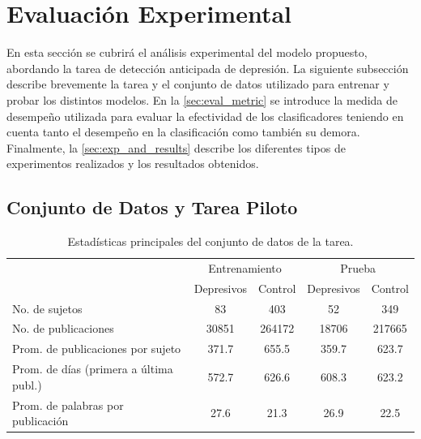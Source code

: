 \section{Evaluación Experimental}
\label{sec:exp}

En esta sección se cubrirá el análisis experimental del modelo propuesto, abordando la tarea de detección anticipada de depresión.
La siguiente subsección describe brevemente la tarea y el conjunto de datos utilizado para entrenar y probar los distintos modelos.
En la \autoref{sec:eval_metric} se introduce la medida de desempeño utilizada para evaluar la efectividad de los clasificadores teniendo en cuenta tanto el desempeño en la clasificación como también su demora.
Finalmente, la \autoref{sec:exp_and_results} describe los diferentes tipos de experimentos realizados y los resultados obtenidos.


\subsection{Conjunto de Datos y Tarea Piloto}
\label{sec:data_sets}

\begin{table}[t]
\centering
\caption{Estadísticas principales del conjunto de datos de la tarea.}
\label{tab:dataset}
\begin{tabular}{l c c|c c}
\hline
& \multicolumn{2}{c}{Entrenamiento} & \multicolumn{2}{c}{Prueba}\\
& Depresivos & Control & Depresivos & Control \\ \hline
No. de sujetos & 83 & 403 & 52 & 349 \\
No. de publicaciones & 30851 & 264172 & 18706 & 217665 \\
Prom. de publicaciones por sujeto & 371.7 & 655.5 & 359.7 & 623.7 \\
Prom. de días (primera a última publ.) & 572.7 & 626.6 & 608.3 & 623.2 \\
Prom. de palabras por publicación & 27.6 & 21.3 & 26.9 & 22.5 \\ \hline

\hline
\end{tabular}
\end{table}

